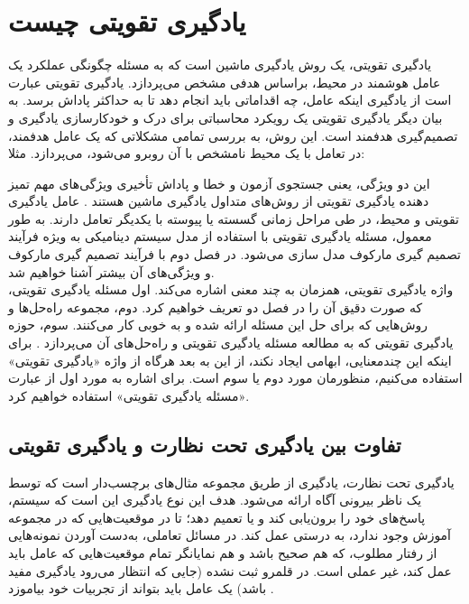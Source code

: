\section{یادگیری تقویتی چیست}
یادگیری تقویتی، یک روش یادگیری ماشین است که  به مسئله چگونگی عملکرد یک عامل هوشمند  در محیط، براساس هدفی مشخص می‌پردازد. یادگیری تقویتی عبارت است از یادگیری اینکه عامل، چه اقداماتی باید انجام دهد تا به حداکثر پاداش برسد. به بیان دیگر یادگیری تقویتی یک رویکرد محاسباتی برای درک و خودکار‌سازی یادگیری و تصمیم‌گیری هدفمند است. این روش، به بررسی تمامی‌ مشکلاتی که یک عامل هدفمند، در تعامل با یک محیط نامشخص با آن روبرو می‌شود، می‌پردازد. مثلا:



 
 

این دو ویژگی،  یعنی جستجوی آزمون و خطا و پاداش تأخیری ویژگی‌های مهم تمیز دهنده یادگیری تقویتی از روش‌های متداول یادگیری ماشین هستند \cite{suttonbook}.
 عامل یادگیری تقویتی و محیط، در طی مراحل زمانی گسسته یا پیوسته با یکدیگر تعامل دارند. به طور معمول، مسئله یادگیری تقویتی با استفاده از مدل سیستم دینامیکی به ویژه فرآیند تصمیم گیری مارکوف مدل سازی می‌شود. در فصل دوم با فرآیند تصمیم گیری مارکوف و ویژگی‌های آن بیشتر آشنا خواهیم شد.\\
 واژه یادگیری تقویتی، همزمان به چند معنی اشاره می‌کند. اول مسئله یادگیری تقویتی، که صورت دقیق آن را در فصل دو تعریف خواهیم کرد. دوم، مجموعه راه‌حل‌ها و روش‌هایی که برای حل این مسئله ارائه شده و به خوبی کار می‌کنند. سوم، حوزه یادگیری تقویتی که به مطالعه مسئله یادگیری تقویتی و راه‌حل‌های آن می‌پردازد
\cite{suttonbook}.
 برای اینکه این چندمعنایی، ابهامی ایجاد نکند، از این به بعد هرگاه از واژه «یادگیری تقویتی» استفاده می‌کنیم، منظورمان  مورد دوم یا سوم است. برای اشاره به مورد اول از عبارت «مسئله یادگیری تقویتی» استفاده خواهیم کرد. 
\subsection*{تفاوت بین یادگیری تحت نظارت و یادگیری تقویتی}
یادگیری تحت نظارت، یادگیری از طریق مجموعه مثال‌های برچسب‌دار است که توسط یک ناظر بیرونی آگاه ارائه می‌شود. هدف این نوع یادگیری این است که سیستم، پاسخ‌های خود را برون‌یابی کند و یا تعمیم دهد؛ تا در موقعیت‌هایی که در مجموعه آموزش وجود ندارد، به درستی عمل کند. در مسائل تعاملی، به‌دست آوردن نمونه‌هایی از رفتار مطلوب، که هم صحیح باشد و هم نمایانگر تمام موقعیت‌هایی که عامل باید عمل کند، غیر عملی است. در قلمرو ثبت نشده (جایی که انتظار می‌رود یادگیری مفید باشد) یک عامل باید بتواند از تجربیات خود بیاموزد
\cite{suttonbook}.
